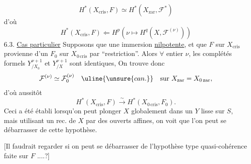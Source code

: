 \[
H^*(X_{\mathrm{cris}},F)\simeq H^*(X_{\mathrm{zar}},\mathcal F^*)
\]
d'où
\[
H^*(X_{\mathrm{cris}},F)\Longleftarrow H^p(\nu\longmapsto H^q(X,\mathcal F^{(\nu)}))
\]
6.3. \uline{Cas particulier} Supposons que  une immersion \uline{nilpotente},  et que $F$ sur $X_{\mathrm{cris}}$ provienne d'un $F_0$ sur $X_{0\,\mathrm{cris}}$ par ``restriction''. Alors $\forall$ entier $\nu$, les complétés formels $Y^{\nu+1}_{/X_0}$ et $Y^{\nu+1}_{/X}$ sont identiques, On trouve donc
\[
\mathcal F^{(\nu)}\simeq\mathcal F_0^{(\nu)}\quad\uline{\unsure{can.}}\quad\text{sur }X_{\mathrm{zar}}=X_{0\,\mathrm{zar}},
\]
d'où aussitôt
\[
H^*(X_{\mathrm{cris}},F)\xrightarrow{\sim}H^*(X_{0\,\mathrm{cris}},F_0).
\]
Ceci a été établi lorsqu'on peut plonger $X$ globalement dans un $Y$  lisse sur $S$, mais  utilisant un rec. de $X$ par des ouverts affines, on voit que l'on peut se débarrasser de cette hypothèse.

[Il faudrait regarder si on peut se débarrasser de l'hypothèse type quasi-cohérence faite sur $F$ ....?]
